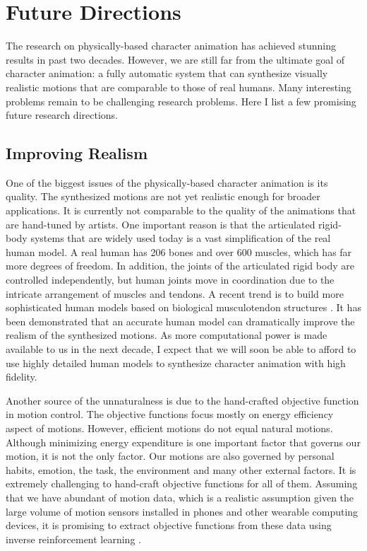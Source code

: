 \section{Future Directions}

The research on physically-based character animation has achieved stunning results in past two decades. However, we are still far from the ultimate goal of character animation: a fully automatic system that can synthesize visually realistic motions that are comparable to those of real humans. Many interesting problems remain to be challenging research problems. Here I list a few promising future research directions.

\subsection{Improving Realism}

One of the biggest issues of the physically-based character animation is its quality. The synthesized motions are not yet realistic enough for broader applications. It is currently not comparable to the quality of the animations that are hand-tuned by artists. One important reason is that the articulated rigid-body systems that are widely used today is a vast simplification of the real human model. A real human has 206 bones and over 600 muscles, which has far more degrees of freedom. In addition, the joints of the articulated rigid body are controlled independently, but human joints move in coordination due to the intricate arrangement of muscles and tendons. A recent trend is to build more sophisticated human models based on biological musculotendon structures \cite{Lee:2006,Lee:2009:CBM,Wang:2012}. It has been demonstrated that an accurate human model can dramatically improve the realism of the synthesized motions. As more computational power is made available to us in the next decade, I expect that we will soon be able to afford to use highly detailed human models to synthesize character animation with high fidelity.

Another source of the unnaturalness is due to the hand-crafted objective function in motion control. The objective functions focus mostly on energy efficiency aspect of motions. However, efficient motions do not equal natural motions. Although minimizing energy expenditure is one important factor that governs our motion, it is not the only factor. Our motions are also governed by personal habits, emotion, the task, the environment and many other external factors. It is extremely challenging to hand-craft objective functions for all of them. Assuming that we have abundant of motion data, which is a realistic assumption given the large volume of motion sensors installed in phones and other wearable computing devices, it is promising to extract objective functions from these data using inverse reinforcement learning \cite{Ng:2000}.


